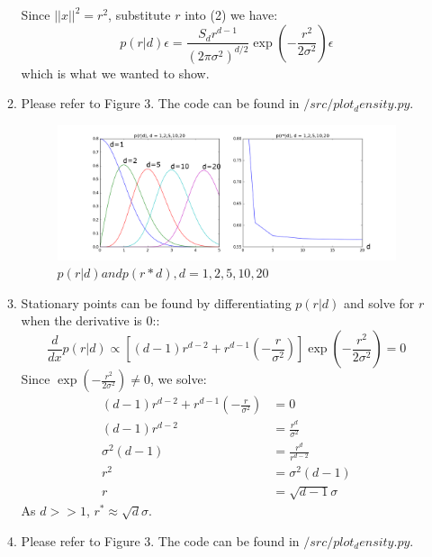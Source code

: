 \documentclass{article}
\begin{document}
\begin{enumerate}
\begin{enumerate}
\begin{equation}
        \end{equation}
        Since $||x||^2 = r^2$, substitute $r$ into (2) we have:
        \begin{equation}
            p(r|d)\epsilon = \frac{S_dr^{d-1}}{(2\pi\sigma^2)^{d/2}}\exp(-\frac{r^2}{2\sigma^2})\epsilon
        \end{equation}
        which is what we wanted to show.
    \item
        Please refer to Figure 3. The code can be found in $/src/plot_density.py$.
        \begin{figure}[h]
            \includegraphics[width=1\linewidth]{figure_3.png}
            \caption{$p(r|d) and p(r*d), d = 1,2,5,10,20$}
            \label{fig:graph3}
        \end{figure}
    \item
        Stationary points can be found by differentiating $p(r|d)$ and solve for $r$ when the derivative is 0::
        \begin{equation} \label{eq4}
            \frac{d}{dx}p(r|d) \propto[(d - 1)r^{d-2} + r^{d-1}(-\frac{r}{\sigma^2})]\exp(-\frac{r^2}{2\sigma^2}) = 0
        \end{equation}
        Since $\exp(-\frac{r^2}{2\sigma^2}) \neq 0$, we solve:
        \begin{equation}\label{eq5}
        \begin{split}
            (d - 1)r^{d-2} + r^{d-1}(-\frac{r}{\sigma^2}) &= 0\\
            (d - 1)r^{d-2} &= \frac{r^d}{\sigma^2}\\
            \sigma^2(d - 1) &= \frac{r^d}{r^{d-2}}\\
            r^2 &= \sigma^2(d - 1)\\
            r &= \sqrt{d-1}\sigma
        \end{split}
        \end{equation}
        As $d >> 1$, $r^* \approx \sqrt{d}\sigma$.
    \item
        Please refer to Figure 3. The code can be found in $/src/plot_density.py$.

\end{enumerate}
\end{enumerate}
\end{document}
